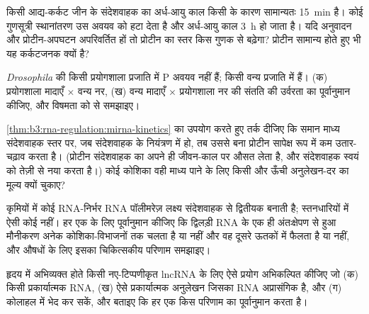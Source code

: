 \begin{exercise}[$\star\star$]\label{exo:b3:rna-regulation:8}
किसी आद्य-कर्कट जीन के संदेशवाहक का अर्ध-आयु काल किसी 
के कारण सामान्यतः \qty{15}{min} है। कोई गुणसूत्री स्थानांतरण उस अवयव को
हटा देता है और अर्ध-आयु काल \qty{3}{h} हो जाता है। यदि अनुवादन और
प्रोटीन-अपघटन अपरिवर्तित हों तो प्रोटीन का स्तर किस गुणक से बढ़ेगा?
प्रोटीन सामान्य होते हुए भी यह कर्कटजनक क्यों है?
\end{exercise}

\begin{exercise}[$\star\star$]\label{exo:b3:rna-regulation:9}
\emph{Drosophila} की किसी प्रयोगशाला प्रजाति में P अवयव नहीं हैं; किसी
वन्य प्रजाति में हैं। (क) प्रयोगशाला मादाएँ $\times$ वन्य नर,
(ख) वन्य मादाएँ $\times$ प्रयोगशाला नर की संतति की उर्वरता का
पूर्वानुमान कीजिए, और विषमता को  से समझाइए।
\end{exercise}

\begin{exercise}[$\star\star\star$]\label{exo:b3:rna-regulation:10}
\cref{thm:b3:rna-regulation:mirna-kinetics} का उपयोग करते हुए तर्क
दीजिए कि समान माध्य संदेशवाहक स्तर पर, जब संदेशवाहक  के
नियंत्रण में हो, तब उससे बना प्रोटीन सापेक्ष रूप में कम उतार-चढ़ाव
करता है। (प्रोटीन संदेशवाहक का अपने ही जीवन-काल पर औसत लेता है, और
संदेशवाहक स्वयं को तेज़ी से नया करता है।) कोई कोशिका वही माध्य पाने के
लिए किसी  और ऊँची अनुलेखन-दर का मूल्य क्यों चुकाए?
\end{exercise}

\begin{exercise}[$\star\star\star$]\label{exo:b3:rna-regulation:11}
कृमियों में कोई RNA-निर्भर RNA पॉलीमरेज़ लक्ष्य संदेशवाहक से द्वितीयक
 बनाती है; स्तनधारियों में ऐसी कोई नहीं। हर एक के लिए पूर्वानुमान
कीजिए कि द्विलड़ी RNA के एक ही अंतःक्षेपण से हुआ मौनीकरण अनेक
कोशिका-विभाजनों तक चलता है या नहीं और वह दूसरे ऊतकों में फैलता है या
नहीं, और  औषधों के लिए इसका चिकित्सकीय परिणाम समझाइए।
\end{exercise}

\begin{exercise}[$\star\star\star$]\label{exo:b3:rna-regulation:12}
हृदय में अभिव्यक्त होते किसी नए-टिप्पणीकृत lncRNA के लिए ऐसे प्रयोग
अभिकल्पित कीजिए जो (क) किसी प्रकार्यात्मक RNA, (ख) ऐसे प्रकार्यात्मक
अनुलेखन जिसका RNA अप्रासंगिक है, और (ग) कोलाहल में भेद कर सकें, और
बताइए कि हर एक किस परिणाम का पूर्वानुमान करता है।
\end{exercise}

